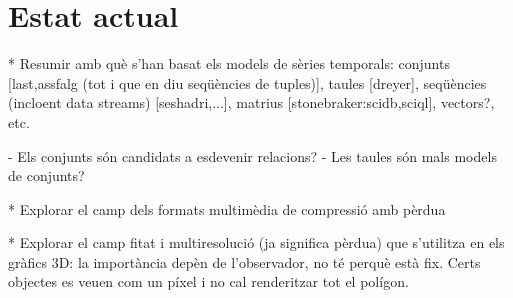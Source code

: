 













\section{Estat actual}

* Resumir amb què s'han basat els models de sèries temporals: conjunts [last,assfalg (tot i que en diu seqüències de tuples)], taules [dreyer], seqüències (incloent data streams) [seshadri,...], matrius [stonebraker:scidb,sciql],  vectors?, etc.
 
  - Els conjunts són candidats a esdevenir relacions?
  - Les taules són mals models de conjunts?



* Explorar el camp dels formats multimèdia de compressió amb pèrdua

* Explorar el camp fitat i multiresolució (ja significa pèrdua) que s'utilitza en els gràfics 3D: la importància depèn de l'observador, no té perquè està fix. Certs objectes es veuen com un píxel i no cal renderitzar tot el polígon.








